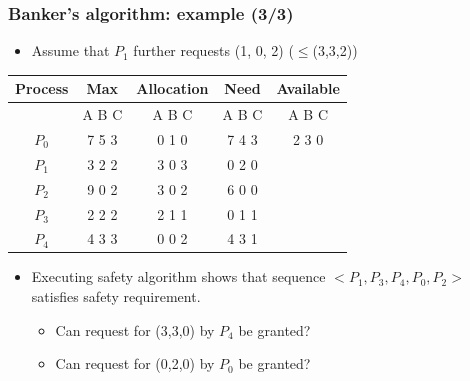 \documentclass[CJKutf8,xcolor=pdftex,dvipsnames,table]{beamer}
\begin{document}
\begin{CJK*}{UTF8}{song}
  \begin{frame}
  \frametitle{Banker's algorithm: example (3/3)} \pause
  \begin{itemize}
  \item{Assume that $P_1$ further requests (1, 0, 2) ($\leq$(3,3,2))} \pause
  \end{itemize}
  \begin{tabular}{ccccc}
    Process & Max   & Allocation & Need  & Available\\
    \hline
            & A B C & A B C      & A B C & A B C\\
    $P_0$   & 7 5 3 & 0 1 0      & 7 4 3 & 2 3 0\\
    $P_1$   & 3 2 2 & 3 0 3      & 0 2 0 &      \\
    $P_2$   & 9 0 2 & 3 0 2      & 6 0 0 &      \\
    $P_3$   & 2 2 2 & 2 1 1      & 0 1 1 &      \\
    $P_4$   & 4 3 3 & 0 0 2      & 4 3 1 &      \\
  \end{tabular} \pause
  \begin{itemize}
  \item{Executing safety algorithm shows that sequence $<P_1, P_3, P_4, P_0, P_2>$ satisfies safety requirement.} \pause
    \begin{itemize}
    \item{Can request for (3,3,0) by $P_4$ be granted?} \pause
    \item{Can request for (0,2,0) by $P_0$ be granted?}
    \end{itemize}
  \end{itemize}
  \end{frame}


\end{CJK*}
\end{document}
